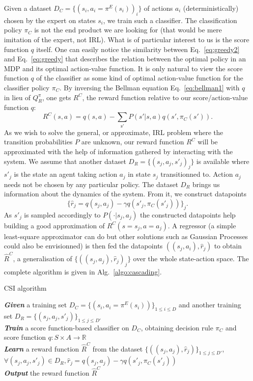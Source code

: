 \documentclass[smallextended]{svjour3}
\begin{document}
Given a dataset $D_C = \{(s_i,a_i=\pi^E(s_i))_i\}$ of actions $a_i$ (deterministically) chosen by the expert on states $s_i$, we train such a classifier. The classification policy $\pi_C$ is not the end product we are looking for (that would be mere imitation of the expert, not IRL). What is of particular interest to us is the score function $q$ itself. One can easily notice the similarity between Eq.~\eqref{eq:greedy2} and Eq.~\eqref{eq:greedy} that describes the relation between the optimal policy in an MDP and its optimal action-value function. It is only natural to view the score function $q$ of the classifier as some kind of optimal action-value function for the classifier policy $\pi_C$. By inversing the Bellman equation Eq.~\eqref{eq:bellman1} with $q$ in lieu of $Q^\pi_R$, one gets $R^C$, the reward function relative to our score/action-value function $q$:
\begin{equation}
  \label{eq:rc}
  R^C(s,a) =q(s,a) - \sum_{\mathrm{s'}}P(s'|s,a)q(s',\pi_C(s')).
\end{equation}
As we wish to solve the general, or approximate, IRL problem where the transition probabilities $P$ are unknown, our reward function $R^C$ will be approximated with the help of information gathered by interacting with the system. We assume that another dataset $D_R = \{(s_j,a_j,s'_j)_j\}$ is available where $s'_j$ is the state an agent taking action $a_j$ in state $s_j$ transitionned to. Action $a_j$ needs not be chosen by any particular policy. The dataset $D_R$ brings us information about the dynamics of the system. From it, we construct datapoints
\begin{equation}
  \label{eq:rj}
  \{\hat r_j = q(s_j,a_j) - \gamma q(s'_j,\pi_C(s'_j))\}_j.
\end{equation}
As $s'_j$ is sampled accordingly to $P(\cdot|s_j,a_j)$ the constructed datapoints help building a good approximation of $R^C(s=s_j,a=a_j)$. A regressor (a simple least-square approximator can do but other solutions such as Gaussian Processes \cite{rasmussen2006gaussian} could also be envisionned) is then fed the datapoints $((s_j,a_i),\hat r_j)$ to obtain $\hat R^C$, a generalisation of $\{((s_j,a_j),\hat r_j)_j\}$ over the whole state-action space. The complete algorithm is given in Alg.~\ref{algo:cascading}.
\begin{algorithm}%
  \caption{CSI algorithm}
  \label{algo:cascading}
  \emph{\textbf{Given}} a training set $D_C=\{(s_i,a_i=\pi^E(s_i))\}_{1\leq i \leq D}$ and another training set $D_R=\{(s_{j},a_{j},s'_{j})\}_{1\leq j \leq D'}$\;\\
  \emph{\textbf{Train}} a score function-based classifier on $D_C$, obtaining decision rule $\pi_C$ and score function $q:S\times A \rightarrow \mathbb R$\;\\
  \emph{\textbf{Learn}} a reward function $\hat R^C$ from the dataset $\{((s_{j},a_{j}),\hat{r}_j)\}_{1\leq j \leq D'}$, $\forall (s_j,a_j,s'_j) \in D_R,\hat{r}_j=q(s_{j},a_{j})-\gamma q(s'_{j},\pi_C(s'_{j}))$\;\\
  \emph{\textbf{Output}} the reward function $\hat R^{C}$ \;
\end{algorithm}
\end{document}
